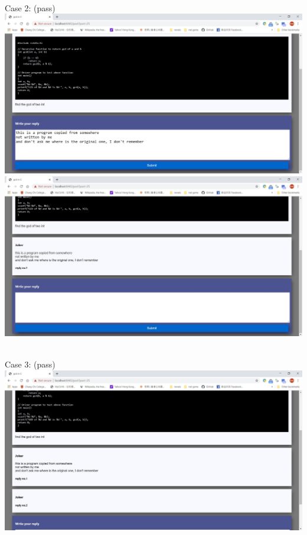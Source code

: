 ~

Case 2: (pass)\\
\includegraphics[scale=0.45]{Doc/Pics/case-8-3-2-1}\\
\includegraphics[scale=0.45]{Doc/Pics/case-8-3-2-2}\\

~

Case 3: (pass)\\
\includegraphics[scale=0.45]{Doc/Pics/case-8-3-3}\\

